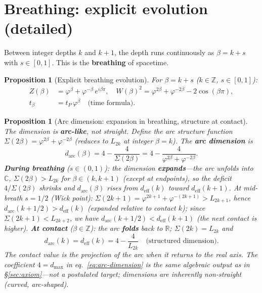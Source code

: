 \documentclass[12pt,a4paper]{article}
\newtheorem{proposition}[theorem]{Proposition}
\begin{document}
\section{Breathing: explicit evolution (detailed)}
\label{sec:breathing}
\label{sec:trunk-breathing}
\label{prop:quantum-breathing-identity}

Between integer depths $k$ and $k+1$, the depth runs continuously as $\beta = k + s$ with $s \in [0,1]$. This is the \textbf{breathing} of spacetime.

\begin{proposition}[Explicit breathing evolution]
\label{prop:breathing-explicit}
For $\beta = k + s$ ($k \in \mathbb{Z}$, $s \in [0,1]$):
\begin{align}
Z(\beta) &= \varphi^\beta + \varphi^{-\beta}\,e^{i\beta\pi}, \quad
W(\beta)^2 = \varphi^{2\beta} + \varphi^{-2\beta} - 2\cos(\beta\pi), \\
t_\beta &= t_P\,\varphi^\beta \quad \text{(time formula)}.
\end{align}
\end{proposition}

\begin{proposition}[Arc dimension: expansion in breathing, structure at contact]
\label{prop:arc-dimension}
\label{thm:arc-dimension}
The dimension is \textbf{arc-like}, not straight. Define the arc structure function $\Sigma(2\beta) = \varphi^{2\beta} + \varphi^{-2\beta}$ (reduces to $L_{2k}$ at integer $\beta = k$). The \textbf{arc dimension} is
\begin{equation}
\boxed{d_{\mathrm{arc}}(\beta) = 4 - \frac{4}{\Sigma(2\beta)} = 4 - \frac{4}{\varphi^{2\beta} + \varphi^{-2\beta}}.}
\label{eq:arc-dimension}
\end{equation}
\textbf{During breathing} ($s \in (0,1)$): the dimension \textbf{expands}---the arc unfolds into $\mathbb{C}$, $\Sigma(2\beta) > L_{2k}$ for $\beta \in (k, k+1)$ (except at endpoints), so the deficit $4/\Sigma(2\beta)$ shrinks and $d_{\mathrm{arc}}(\beta)$ rises from $d_{\mathrm{eff}}(k)$ toward $d_{\mathrm{eff}}(k+1)$. At mid-breath $s = 1/2$ (Wick point): $\Sigma(2k+1) = \varphi^{2k+1} + \varphi^{-(2k+1)} > L_{2k+1}$, hence $d_{\mathrm{arc}}(k+1/2) > d_{\mathrm{eff}}(k)$ (expanded relative to contact $k$); since $\Sigma(2k+1) < L_{2k+2}$, we have $d_{\mathrm{arc}}(k+1/2) < d_{\mathrm{eff}}(k+1)$ (the next contact is higher). \textbf{At contact} ($\beta \in \mathbb{Z}$): the arc \textbf{folds} back to $\mathbb{R}$; $\Sigma(2k) = L_{2k}$ and
\begin{equation}
d_{\mathrm{arc}}(k) = d_{\mathrm{eff}}(k) = 4 - \frac{4}{L_{2k}} \quad \text{(structured dimension)}.
\end{equation}
The contact value is the projection of the arc when it returns to the real axis. The coefficient $4 = d_{\max}$ in eq.~\eqref{eq:arc-dimension} is the same algebraic output as in \S\ref{sec:axiom}---not a postulated target; dimensions are inherently non-straight (curved, arc-shaped).
\end{proposition}
\end{document}
